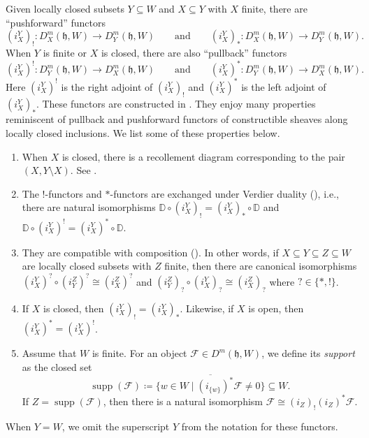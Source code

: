 \documentclass{amsart}
\newcommand{\scrF}{\mathcal{F}}
\newcommand{\BE}{D^m}
\newcommand{\fr}[1]{\mathfrak{#1}}
\newcommand{\DD}{\mathbb{D}}
\DeclareMathOperator{\supp}{supp}
\theoremstyle{definition}
\begin{document}
        Given locally closed subsets $Y \subseteq W$ and $X \subseteq Y$ with $X$ finite, there are ``pushforward'' functors
        \[(i_X^Y)_! : \BE_X (\fr{h}, W) \to \BE_Y (\fr{h}, W) \qquad\text{and}\qquad (i_X^Y)_* : \BE_X (\fr{h}, W) \to \BE_Y (\fr{h}, W).\]
        When $Y$ is finite or $X$ is closed, there are also ``pullback'' functors
        \[(i_X^Y)^! : \BE_Y (\fr{h}, W) \to \BE_X (\fr{h}, W) \qquad\text{and}\qquad (i_X^Y)^* : \BE_Y (\fr{h}, W) \to \BE_X (\fr{h}, W). \]
        Here $(i_X^Y)^!$ is the right adjoint of $(i_X^Y)_!$ and $(i_X^Y)^*$ is the left adjoint of $(i_X^Y)_*$.
        These functors are constructed in \cite[\S5.4]{ARV}. They enjoy many properties reminiscent of pullback and pushforward functors of constructible sheaves along locally closed inclusions.
        We list some of these properties below.
        \begin{enumerate}
                \item When $X$ is closed, there is a recollement diagram corresponding to the pair $(X, Y \setminus X)$. See \cite[Proposition 5.6]{ARV}.
                \item The $!$-functors and $*$-functors are exchanged under Verdier duality (\!\cite[(5.15)]{ARV}), i.e., there are natural isomorphisms $\DD \circ (i_X^Y)_! = (i_X^Y)_* \circ \DD$ and $\DD \circ (i_X^Y)^! = (i_X^Y)^* \circ \DD$.
                \item They are compatible with composition (\!\cite[Lemma 5.12]{ARV}). In other words, if $X \subseteq Y \subseteq Z \subseteq W$ are locally closed subsets with $Z$ finite, then there are canonical isomorphisms $(i_X^Y)^? \circ (i_Y^Z)^? \cong (i_X^Z)^?$ and $(i_Y^Z)_? \circ (i_X^Y)_? \cong (i_X^Z)_?$ where $? \in \{*,!\}$.
                \item If $X$ is closed, then $(i_X^Y)_! = (i_X^Y)_*$. Likewise, if $X$ is open, then $(i_X^Y)^* = (i_X^Y)^!$.
                \item Assume that $W$ is finite.
                For an object $\scrF \in \BE (\fr{h}, W)$, we define its \emph{support} as the closed set 
                \[\supp (\scrF) \coloneq \overline{\{w \in W \mid (i_{\{w\}})^* \scrF \neq 0 \} } \subseteq W.\]
                If $Z = \supp (\scrF)$, then there is a natural isomorphism $\scrF \cong (i_Z)_! (i_Z)^* \scrF$.
        \end{enumerate}
        When $Y = W$, we omit the superscript $Y$ from the notation for these functors.
\end{document}
